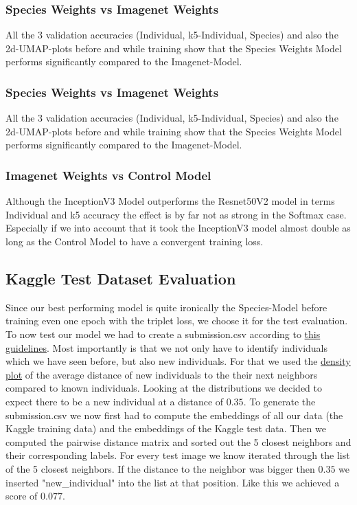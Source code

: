 \subsubsection{Species Weights vs Imagenet Weights}
All the 3 validation accuracies (Individual, k5-Individual, Species) and also the 2d-UMAP-plots before and while training show that the Species Weights Model performs significantly compared to the Imagenet-Model.


\subsubsection{Species Weights vs Imagenet Weights}
All the 3 validation accuracies (Individual, k5-Individual, Species) and also the 2d-UMAP-plots before and while training show that the Species Weights Model performs significantly compared to the Imagenet-Model.

\subsubsection{Imagenet Weights vs Control Model}
Although the InceptionV3 Model outperforms the Resnet50V2 model in terms Individual and k5 accuracy the effect is by far not as strong in the Softmax case. Especially if we into account that it took the InceptionV3 model almost double as long as the Control Model to have a convergent training loss. 

\subsection{Kaggle Test Dataset Evaluation}
Since our best performing model is quite ironically the Species-Model before training even one epoch with the triplet loss, we choose it for the test evaluation. 
To now test our model we had to create a submission.csv according to \href{https://www.kaggle.com/competitions/happy-whale-and-dolphin/overview/evaluation}{this guidelines}.
Most importantly is that we not only have to identify individuals which we have seen before, but also new individuals. 
For that we used the \href{https://drive.google.com/uc?id=1syxxE7cTRHr7iRN7vo19Wp3ewCINJxEg}{density plot} of the average distance of new individuals to the their next neighbors compared to known individuals. Looking at the distributions we decided to expect there to be a new individual at a distance of $0.35$. 
To generate the submission.csv we now first had to compute the embeddings of all our data (the Kaggle training data) and the embeddings of the Kaggle test data. Then we computed the pairwise distance matrix and sorted out the 5 closest neighbors and their corresponding labels. For every test image we know iterated through the list of the 5 closest neighbors. If the distance to the neighbor was bigger then $0.35$ we inserted "new\_individual" into the list at that position. Like this we achieved a score of $0.077$.
